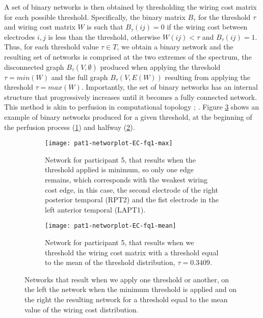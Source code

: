 \documentclass[11pt, onecolumn]{article}
\begin{document}
A set of binary networks is then obtained by thresholding the wiring cost matrix for each possible threshold. Specifically, the binary matrix $B_{\tau}$ for the threshold $\tau$ and wiring cost matrix $W$ is such that $B_{\tau}(ij) =0$ if the wiring cost between electrodes $i,j$ is less than the threshold, otherwise $W(ij) < \tau$ and $B_{\tau}(ij)=1$. 
Thus, for each threshold value $\tau \in T$, we obtain a binary network and the resulting set of networks is comprised at the two extremes of the spectrum, the disconnected graph $B_{\tau}(V,\emptyset)$ produced when applying the threshold $\tau = min(W)$ and the full graph $B_{\tau}(V,E(W))$ resulting from applying the threshold $\tau = max(W)$. 
Importantly, the set of binary networks has an internal structure that progressively increases until it becomes a fully connected network. This method is akin to perfusion in computational topology \citep{dabaghian2014reconceiving}; \citep{dotko2016topological}. 
Figure \ref{fig:binaryplotnetwork} shows an example of binary networks produced for a given threshold, at the beginning of the perfusion process (\ref{binaryplotnetwork:a}) and halfway (\ref{binaryplotnetwork:b}). 

\begin{figure}[ht] 
  \begin{subfigure}[t]{0.5\linewidth}
    \centering
    \texttt{[image: pat1-networplot-EC-fq1-max]} 
    \caption{Network for participant 5, that results when  the threshold applied is minimum, so only one edge remains, which corresponds with the weakest wiring cost edge, in this case, the second electrode of the right posterior temporal (RPT2) and the fist electrode in the left anterior temporal (LAPT1).} 
    \label{binaryplotnetwork:a} 
    \vspace{4ex}
  \end{subfigure}%
  \hspace{1ex}
  \begin{subfigure}[t]{0.5\linewidth}
    \centering
    \texttt{[image: pat1-networplot-EC-fq1-mean]} 
    \caption{Network for participant 5, that results when we threshold the wiring cost matrix with a threshold equal to the mean of the threshold distribution, $\tau =  0.3409$.}
    \label{binaryplotnetwork:b} 
    \vspace{4ex}
  \end{subfigure} 
  \caption{Networks that result when we apply one threshold or another, on the left the network when the minimum threshold is applied
and on the right the resulting network for a threshold equal to the mean value of the wiring cost distribution.}
  \label{fig:binaryplotnetwork} 
\end{figure}
\end{document}
